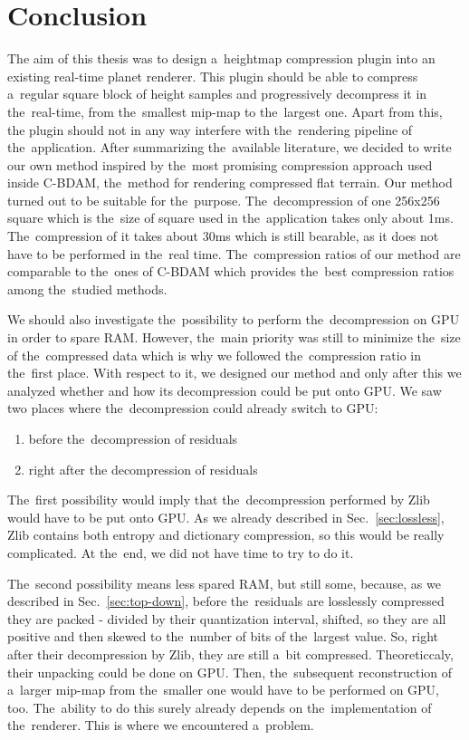 \chapter{Conclusion}\label{sec:conclusion}

The aim of this thesis was to design a~heightmap compression plugin into an existing real-time planet renderer. This plugin should be able to compress a~regular square block of height samples and progressively decompress it in the~real-time, from the~smallest mip-map to the~largest one. Apart from this, the plugin should not in any way interfere with the~rendering pipeline of the~application. After summarizing the~available literature, we decided to write our own method inspired by the~most promising compression approach used inside C-BDAM, the~method for rendering compressed flat terrain. Our method turned out to be suitable for the~purpose. The~decompression of one 256x256 square which is the~size of square used in the~application takes only about 1ms. The~compression of it takes about 30ms which is still bearable, as it does not have to be performed in the~real time. The~compression ratios of our method are comparable to the~ones of C-BDAM which provides the~best compression ratios among the~studied methods.

We should also investigate the~possibility to perform the~decompression on GPU in order to spare RAM. However, the~main priority was still to minimize the~size of the~compressed data which is why we followed the~compression ratio in the~first place. With respect to it, we designed our method and only after this we analyzed whether and how its decompression could be put onto GPU. We saw two places where the~decompression could already switch to GPU:
\begin{enumerate}
	\item{before the~decompression of residuals}
	\item{right after the decompression of residuals}
\end{enumerate}

The~first possibility would imply that the~decompression performed by Zlib would have to be put onto GPU. As we already described in Sec.~\ref{sec:lossless}, Zlib contains both entropy and dictionary compression, so this would be really complicated. At the~end, we did not have time to try to do it.

The~second possibility means less spared RAM, but still some, because, as we described in Sec.~\ref{sec:top-down}, before the~residuals are losslessly compressed they are packed - divided by their quantization interval, shifted, so they are all positive and then skewed to the~number of bits of the~largest value. So, right after their decompression by Zlib, they are still a~bit compressed. Theoreticcaly, their unpacking could be done on GPU. Then, the~subsequent reconstruction of a~larger mip-map from the~smaller one would have to be performed on GPU, too. The~ability to do this surely already depends on the~implementation of the~renderer. This is where we encountered a~problem.

